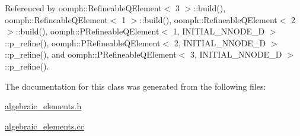 Referenced by oomph\+::\+Refineable\+Q\+Element$<$ 3 $>$\+::build(), oomph\+::\+Refineable\+Q\+Element$<$ 1 $>$\+::build(), oomph\+::\+Refineable\+Q\+Element$<$ 2 $>$\+::build(), oomph\+::\+P\+Refineable\+Q\+Element$<$ 1, I\+N\+I\+T\+I\+A\+L\+\_\+\+N\+N\+O\+D\+E\+\_\+D $>$\+::p\+\_\+refine(), oomph\+::\+P\+Refineable\+Q\+Element$<$ 2, I\+N\+I\+T\+I\+A\+L\+\_\+\+N\+N\+O\+D\+E\+\_\+D $>$\+::p\+\_\+refine(), and oomph\+::\+P\+Refineable\+Q\+Element$<$ 3, I\+N\+I\+T\+I\+A\+L\+\_\+\+N\+N\+O\+D\+E\+\_\+D $>$\+::p\+\_\+refine().



The documentation for this class was generated from the following files\+:\begin{DoxyCompactItemize}
\item 
\hyperlink{algebraic__elements_8h}{algebraic\+\_\+elements.\+h}\item 
\hyperlink{algebraic__elements_8cc}{algebraic\+\_\+elements.\+cc}\end{DoxyCompactItemize}
